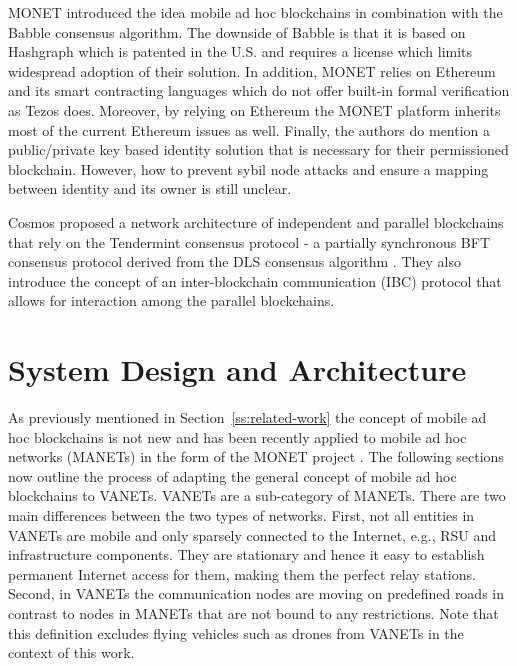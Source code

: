 \documentclass{llncs}
\begin{document}
{			MONET \cite{monetWhitepaper} introduced the idea mobile ad hoc blockchains in combination with the Babble consensus algorithm. The downside of Babble is that it is based on Hashgraph \cite{hashgraphWhitepaper} which is patented in the U.S. and requires a license which limits widespread adoption of their solution. In addition, MONET relies on Ethereum and its smart contracting languages which do not offer built-in formal verification as Tezos does. Moreover, by relying on Ethereum the MONET platform inherits most of the current Ethereum issues as well. Finally, the authors do mention a public/private key based identity solution that is necessary for their permissioned blockchain. However, how to prevent sybil node attacks and ensure a mapping between identity and its owner is still unclear.

			Cosmos \cite{cosmosWhitepaper} proposed a network architecture of independent and parallel blockchains that rely on the Tendermint consensus protocol - a partially synchronous BFT consensus protocol derived from the DLS consensus algorithm \cite{dwork1988consensus}. They also introduce the concept of an inter-blockchain communication (IBC) protocol that allows for interaction among the parallel blockchains.
			


	\section{System Design and Architecture}
		\label{s:section-3}
		
		
		As previously mentioned in Section~\ref{ss:related-work} the concept of mobile ad hoc blockchains is not new and has been recently applied to mobile ad hoc networks (MANETs) in the form of the MONET project \cite{monetWhitepaper}. The following sections now outline the process of adapting the general concept of mobile ad hoc blockchains to VANETs. VANETs are a sub-category of MANETs. There are two main differences between the two types of networks. First, not all entities in VANETs are mobile and only sparsely connected to the Internet, e.g., RSU and infrastructure components. They are stationary and hence it easy to establish permanent Internet access for them, making them the perfect relay stations. Second, in VANETs the communication nodes are moving on predefined roads in contrast to nodes in MANETs that are not bound to any restrictions. Note that this definition excludes flying vehicles such as drones from VANETs in the context of this work.  
		
}
\end{document}
